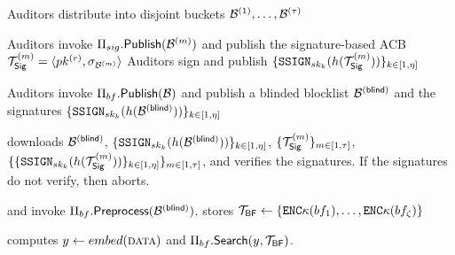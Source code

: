 %


\begin{algorithm}[t]
\caption{\protocolEM: content moderation with exact matching}
\label{}
\footnotesize
\begin{algorithmic}[1]

\Statex{}
\State Auditors distribute \blocklist into \numBlocklistParts disjoint buckets $\blocklistPartition{1}, \dots, \blocklistPartition{\numBlocklistParts}$ 

\State Auditors invoke $\sigACB.\publishList(\blocklistPartition{\partitionIdx})$ and publish the signature-based ACB $\sigBlklistToken{\partitionIdx} = \langle \auditorPubKeyOurScheme, \genericSig[\blocklistPartition{\partitionIdx}] \rangle$
\State Auditors sign and publish $\{ \signGenSig[\auditorPrivKeyGenericScheme[\auditorIdx]](\hashFn(\sigBlklistToken{\partitionIdx})) \}_{\auditorIdx \in [1, \numAuditors]}$
\EndFor

\Statex{}
\State Auditors invoke $\bfACB.\publishList(\blocklist)$ and publish a blinded blocklist $\blindedBlocklist$ and the signatures $\{ \signGenSig[\auditorPrivKeyGenericScheme[\auditorIdx]](\hashFn(\blindedBlocklist) ) \}_{\auditorIdx \in [1, \numAuditors]}$

\Statex{}

\State \client downloads $\blindedBlocklist$,  $\{ \signGenSig[\auditorPrivKeyGenericScheme[\auditorIdx]](\hashFn(\blindedBlocklist)) \}_{\auditorIdx \in [1, \numAuditors]}$, $\{\sigBlklistToken{\partitionIdx}\}_{\partitionIdx \in [1, \numBlocklistParts]}$, $\{ \{ \signGenSig[\auditorPrivKeyGenericScheme[\auditorIdx]](\hashFn(\sigBlklistToken{\partitionIdx})) \}_{\auditorIdx \in [1, \numAuditors]}\}_{\partitionIdx \in [1, \numBlocklistParts]}$, and verifies the signatures. If the signatures do not verify, then \client aborts. 

\State \client and \server invoke $\bfACB.\preprocess(\blindedBlocklist)$. \client stores $\bfBlklistToken \assign \{\encrypt{\genericSymmKey}(\bloomFilter[1]), \dots, \encrypt{\genericSymmKey}(\bloomFilter[\numBins])\}$ 


\Statex{}


\State \client computes $\genericCInputElmt \assign \contentHash(\clientData)$ and $\bfACB.\searchBlocklist(\genericCInputElmt, \bfBlklistToken)$. 



\end{algorithmic}
\end{algorithm}
